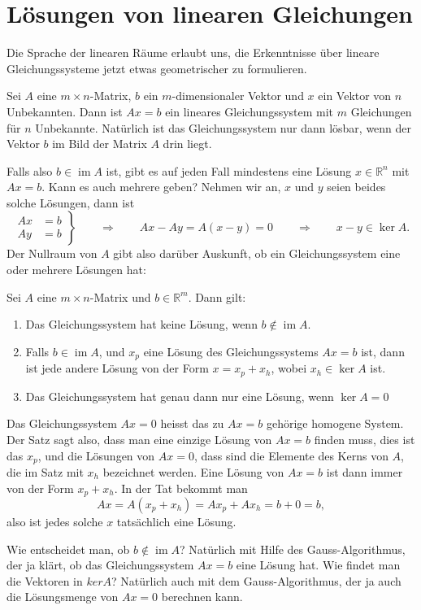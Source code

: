 %
%
%
\section{Lösungen von linearen Gleichungen}
Die Sprache der linearen Räume erlaubt uns, die Erkenntnisse über
lineare Gleichungssysteme jetzt etwas geometrischer zu formulieren.

Sei $A$ eine $m\times n$-Matrix, $b$ ein $m$-dimensionaler Vektor und $x$
ein Vektor von $n$ Unbekannten.
Dann ist $Ax=b$ ein lineares Gleichungssystem
mit $m$ Gleichungen für $n$ Unbekannte.
Natürlich ist das Gleichungssystem
nur dann lösbar, wenn der Vektor $b$ im Bild der Matrix $A$ drin liegt.

Falls also $b\in\operatorname{im}A$ ist, gibt es auf jeden Fall mindestens
eine Lösung $x\in\mathbb R^n$ mit $Ax=b$.
Kann es auch mehrere geben? Nehmen
wir an, $x$ und $y$ seien beides solche Lösungen, dann ist
\[
\left.
\begin{aligned}
Ax&=b\\
Ay&=b
\end{aligned}
\right\}
\qquad\Rightarrow\qquad
Ax-Ay=A(x-y)=0
\qquad\Rightarrow\qquad
x-y\in\operatorname{ker}A.
\]
Der Nullraum von $A$ gibt also darüber Auskunft, ob ein Gleichungssystem
eine oder mehrere Lösungen hat:
\begin{satz}
Sei $A$ eine $m\times n$-Matrix und $b\in\mathbb R^m$.
Dann gilt:
\begin{enumerate}
\item Das Gleichungssystem hat keine Lösung, wenn $b\not\in \operatorname{im}A$.
\item Falls $b\in\operatorname{im}A$, und $x_p$ eine Lösung des Gleichungssystems
$Ax=b$ ist, dann ist jede andere Lösung von der Form $x=x_p+x_h$, wobei
$x_h\in\operatorname{ker}A$ ist.
\item Das Gleichungssystem hat genau dann nur eine Lösung, wenn $\operatorname{ker}A=0$
\end{enumerate}
\end{satz}
Das Gleichungssystem $Ax=0$ heisst das zu $Ax=b$ gehörige homogene System.
Der Satz sagt also, dass man eine einzige Lösung von $Ax=b$ finden muss,
dies ist das $x_p$, und die Lösungen von $Ax=0$, dass sind die Elemente
des Kerns von $A$, die im Satz mit $x_h$ bezeichnet werden.
Eine Lösung von $Ax=b$ ist dann immer von der Form $x_p+x_h$.
In der Tat bekommt
man 
\[
Ax=A(x_p+x_h)=Ax_p+Ax_h=b+0=b,
\]
also ist jedes solche $x$ tatsächlich eine Lösung.

Wie entscheidet man, ob $b\not\in\operatorname{im}A$? Natürlich mit
Hilfe des Gauss-Algorithmus, der ja klärt, ob das Gleichungssystem
$Ax=b$ eine Lösung hat.
Wie findet man die Vektoren in $ker A$?
Natürlich auch mit dem Gauss-Algorithmus, der ja auch die Lösungsmenge
von $Ax=0$ berechnen kann.

